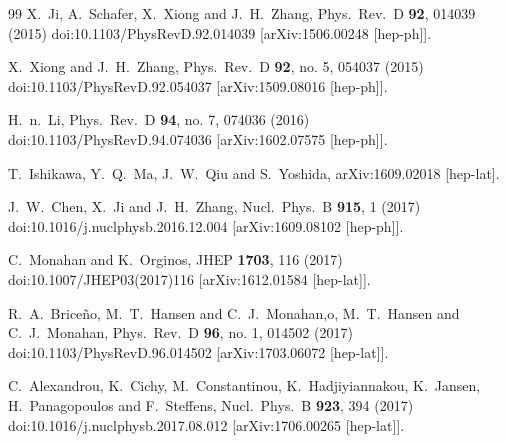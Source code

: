 \documentclass[aps,prd,preprint,tightenlines,superscriptaddress,nofootinbib]{revtex4}
\begin{document}
\begin{thebibliography}{99}
  X.~Ji, A.~Schafer, X.~Xiong and J.~H.~Zhang,
  Phys.\ Rev.\ D {\bf 92}, 014039 (2015)
  doi:10.1103/PhysRevD.92.014039
  [arXiv:1506.00248 [hep-ph]].

  X.~Xiong and J.~H.~Zhang,
  Phys.\ Rev.\ D {\bf 92}, no. 5, 054037 (2015)
  doi:10.1103/PhysRevD.92.054037
  [arXiv:1509.08016 [hep-ph]].

  H.~n.~Li,
  Phys.\ Rev.\ D {\bf 94}, no. 7, 074036 (2016)
  doi:10.1103/PhysRevD.94.074036
  [arXiv:1602.07575 [hep-ph]].


  T.~Ishikawa, Y.~Q.~Ma, J.~W.~Qiu and S.~Yoshida,
  arXiv:1609.02018 [hep-lat].


  J.~W.~Chen, X.~Ji and J.~H.~Zhang,
  Nucl.\ Phys.\ B {\bf 915}, 1 (2017)
  doi:10.1016/j.nuclphysb.2016.12.004
  [arXiv:1609.08102 [hep-ph]].

  C.~Monahan and K.~Orginos,
  JHEP {\bf 1703}, 116 (2017)
  doi:10.1007/JHEP03(2017)116
  [arXiv:1612.01584 [hep-lat]].
  
  R.~A.~Briceño, M.~T.~Hansen and C.~J.~Monahan,o, M.~T.~Hansen and C.~J.~Monahan,
  Phys.\ Rev.\ D {\bf 96}, no. 1, 014502 (2017)
  doi:10.1103/PhysRevD.96.014502
  [arXiv:1703.06072 [hep-lat]].

  C.~Alexandrou, K.~Cichy, M.~Constantinou, K.~Hadjiyiannakou, K.~Jansen, H.~Panagopoulos and F.~Steffens,
  Nucl.\ Phys.\ B {\bf 923}, 394 (2017)
  doi:10.1016/j.nuclphysb.2017.08.012
  [arXiv:1706.00265 [hep-lat]].


\end{thebibliography}
\end{document}

